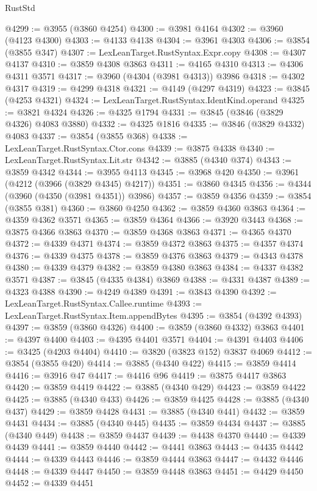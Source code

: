 \begin{lexlean}{RustStd}
\begin{coremodule}
@4299 := @3955 (@3860 @4254)
@4300 := @3981 @4164
@4302 := @3960 (@4123 @4300)
@4303 := @4133 @4138
@4304 := @3961 @4303
@4306 := @3854 (@3855 @347)
@4307 := LexLeanTarget.RustSyntax.Expr.copy
@4308 := @4307 @4137
@4310 := @3859 @4308 @3863
@4311 := @4165 @4310
@4313 := @4306 @4311 @3571
@4317 := @3960 (@4304 (@3981 @4313)) @3986
@4318 := @4302 @4317
@4319 := @4299 @4318
@4321 := @4149 (@4297 @4319)
@4323 := @3845 (@4253 @4321)
@4324 := LexLeanTarget.RustSyntax.IdentKind.operand
@4325 := @3821 @4324
@4326 := @4325 @1794
@4331 := @3845 (@3846 (@3829 @4326) @4083 @3880)
@4332 := @4325 @1816
@4335 := @3846 (@3829 @4332) @4083
@4337 := @3854 (@3855 @368)
@4338 := LexLeanTarget.RustSyntax.Ctor.cons
@4339 := @3875 @4338
@4340 := LexLeanTarget.RustSyntax.Lit.str
@4342 := @3885 (@4340 @374)
@4343 := @3859 @4342
@4344 := @3955 @4113
@4345 := @3968 @420
@4350 := @3961 (@4212 (@3966 (@3829 @4345) @4217))
@4351 := @3860 @4345
@4356 := @4344 (@3960 (@4350 (@3981 @4351)) @3986)
@4357 := @3859 @4356
@4359 := @3854 (@3855 @381)
@4360 := @3860 @4250
@4362 := @3859 @4360 @3863
@4364 := @4359 @4362 @3571
@4365 := @3859 @4364
@4366 := @3920 @3443
@4368 := @3875 @4366 @3863
@4370 := @3859 @4368 @3863
@4371 := @4365 @4370
@4372 := @4339 @4371
@4374 := @3859 @4372 @3863
@4375 := @4357 @4374
@4376 := @4339 @4375
@4378 := @3859 @4376 @3863
@4379 := @4343 @4378
@4380 := @4339 @4379
@4382 := @3859 @4380 @3863
@4384 := @4337 @4382 @3571
@4387 := @3845 (@4335 @4384) @3869
@4388 := @4331 @4387
@4389 := @4323 @4388
@4390 := @4249 @4389
@4391 := @3843 @4390
@4392 := LexLeanTarget.RustSyntax.Callee.runtime
@4393 := LexLeanTarget.RustSyntax.Item.appendBytes
@4395 := @3854 (@4392 @4393)
@4397 := @3859 (@3860 @4326)
@4400 := @3859 (@3860 @4332) @3863
@4401 := @4397 @4400
@4403 := @4395 @4401 @3571
@4404 := @4391 @4403
@4406 := @3425 (@4203 @4404)
@4410 := @3820 (@3823 @152) @3837 @4069
@4412 := @3854 (@3855 @420)
@4414 := @3885 (@4340 @422)
@4415 := @3859 @4414
@4416 := @3916 @47
@4417 := @4416 @96
@4419 := @3875 @4417 @3863
@4420 := @3859 @4419
@4422 := @3885 (@4340 @429)
@4423 := @3859 @4422
@4425 := @3885 (@4340 @433)
@4426 := @3859 @4425
@4428 := @3885 (@4340 @437)
@4429 := @3859 @4428
@4431 := @3885 (@4340 @441)
@4432 := @3859 @4431
@4434 := @3885 (@4340 @445)
@4435 := @3859 @4434
@4437 := @3885 (@4340 @449)
@4438 := @3859 @4437
@4439 := @4438 @4370
@4440 := @4339 @4439
@4441 := @3859 @4440
@4442 := @4441 @3863
@4443 := @4435 @4442
@4444 := @4339 @4443
@4446 := @3859 @4444 @3863
@4447 := @4432 @4446
@4448 := @4339 @4447
@4450 := @3859 @4448 @3863
@4451 := @4429 @4450
@4452 := @4339 @4451

\end{coremodule}
\end{lexlean}
